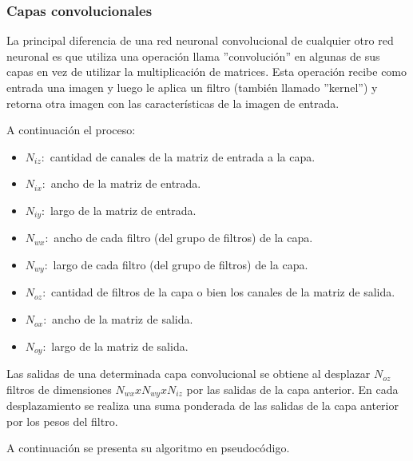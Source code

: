 \subsubsection{Capas convolucionales}

La principal diferencia de una red neuronal convolucional de cualquier otro red neuronal es que utiliza una operación llama ''convolución'' en algunas de sus capas en vez de utilizar la multiplicación de matrices. Esta operación recibe como entrada una imagen y luego le aplica un filtro (también llamado ''kernel'') y retorna otra imagen con las características de la imagen de entrada.\par
A continuación el proceso: \par

\begin{figure}[!h]
    \centering
     
    \label{fig:opconvolucion}
\end{figure}

\begin{itemize}
    \item $N_{iz}:$ cantidad de canales de la matriz de entrada a la capa. 
    \item $N_{ix}:$ ancho de la matriz de entrada. 
    \item $N_{iy}:$ largo de la matriz de entrada.
    \item $N_{wx}:$ ancho de cada filtro (del grupo de filtros) de la capa.
    \item $N_{wy}:$ largo de cada filtro (del grupo de filtros) de la capa.
    \item $N_{oz}:$ cantidad de filtros de la capa o bien los canales de la matriz de salida.
    \item $N_{ox}:$ ancho de la matriz de salida.
    \item $N_{oy}:$ largo de la matriz de salida.
\end{itemize}

Las salidas de una determinada capa convolucional se obtiene al desplazar $N_{oz}$ filtros de dimensiones $ N_{wx} x N_{wy} x N_{iz}$ por las salidas de la capa anterior. En cada desplazamiento se realiza una suma ponderada de las salidas de la capa anterior por los pesos del filtro.\par

A continuación se presenta su algoritmo en pseudocódigo.\par

 

